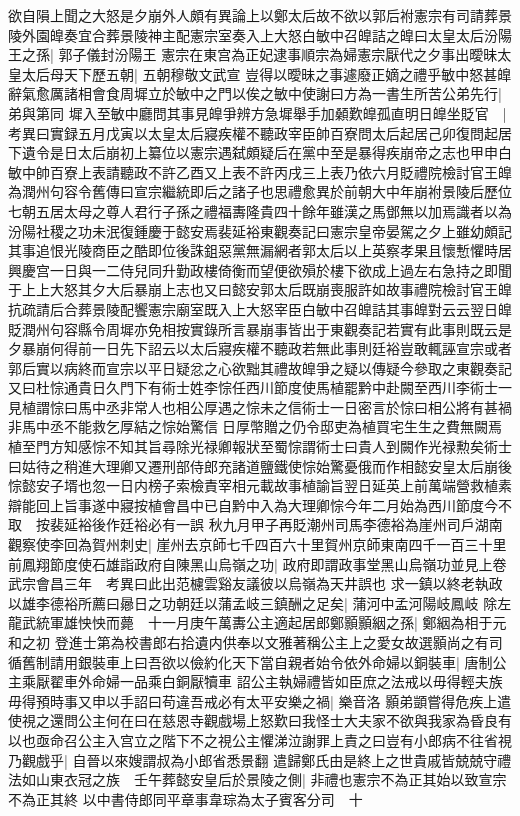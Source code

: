 欲自隕上聞之大怒是夕崩外人頗有異論上以鄭太后故不欲以郭后袝憲宗有司請葬景陵外園皥奏宜合葬景陵神主配憲宗室奏入上大怒白敏中召皥詰之皥曰太皇太后汾陽王之孫|{
	郭子儀封汾陽王}
憲宗在東宫為正妃逮事順宗為婦憲宗厭代之夕事出曖昧太皇太后母天下歷五朝|{
	五朝穆敬文武宣}
豈得以曖昧之事遽廢正嫡之禮乎敏中怒甚皥辭氣愈厲諸相會食周墀立於敏中之門以俟之敏中使謝曰方為一書生所苦公弟先行|{
	弟與第同}
墀入至敏中廳問其事見皥爭辨方急墀舉手加顙歎皥孤直明日皥坐貶官　|{
	考異曰實録五月戊寅以太皇太后寢疾權不聽政宰臣帥百寮問太后起居己卯復問起居下遺令是日太后崩初上纂位以憲宗遇弑頗疑后在黨中至是暴得疾崩帝之志也甲申白敏中帥百寮上表請聽政不許乙酉又上表不許丙戌三上表乃依六月貶禮院檢討官王皥為潤州句容令舊傳曰宣宗繼統即后之諸子也思禮愈異於前朝大中年崩袝景陵后歷位七朝五居太母之尊人君行子孫之禮福夀隆貴四十餘年雖漢之馬鄧無以加焉識者以為汾陽社稷之功未泯復鍾慶于懿安焉裴延裕東觀奏記曰憲宗皇帝晏駕之夕上雖幼頗記其事追恨光陵商臣之酷即位後誅鉏惡黨無漏網者郭太后以上英察孝果且懷慙懼時居興慶宫一日與一二侍兒同升勤政樓倚衡而望便欲殞於樓下欲成上過左右急持之即聞于上上大怒其夕大后暴崩上志也又曰懿安郭太后既崩喪服許如故事禮院檢討官王皥抗疏請后合葬景陵配饗憲宗廟室既入上大怒宰臣白敏中召皥詰其事皥對云云翌日皥貶潤州句容縣令周墀亦免相按實錄所言暴崩事皆出于東觀奏記若實有此事則既云是夕暴崩何得前一日先下詔云以太后寢疾權不聽政若無此事則廷裕豈敢輒誣宣宗或者郭后實以病終而宣宗以平日疑忿之心欲黜其禮故皥爭之疑以傳疑今參取之東觀奏記又曰杜悰通貴日久門下有術士姓李悰任西川節度使馬植罷黔中赴闕至西川李術士一見植謂悰曰馬中丞非常人也相公厚遇之悰未之信術士一日密言於悰曰相公將有甚禍非馬中丞不能救乞厚結之悰始驚信日厚幣贈之仍令邸吏為植買宅生生之費無闕焉植至門方知感悰不知其旨尋除光禄卿報狀至蜀悰謂術士曰貴人到闕作光禄勲矣術士曰姑待之稍進大理卿又遷刑部侍郎充諸道鹽鐵使悰始驚憂俄而作相懿安皇太后崩後悰懿安子壻也忽一日内榜子索檢責宰相元載故事植諭旨翌日延英上前萬端營救植素辯能回上旨事遂中寢按植會昌中已自黔中入為大理卿悰今年二月始為西川節度今不取　按裴延裕後作廷裕必有一誤}
秋九月甲子再貶潮州司馬李德裕為崖州司戶湖南觀察使李回為賀州刺史|{
	崖州去京師七千四百六十里賀州京師東南四千一百三十里}
前鳳翔節度使石雄詣政府自陳黑山烏嶺之功|{
	政府即謂政事堂黑山烏嶺功並見上卷武宗會昌三年　考異曰此出范櫖雲谿友議彼以烏嶺為天井誤也}
求一鎮以終老執政以雄李德裕所薦曰曏日之功朝廷以蒲孟岐三鎮酬之足矣|{
	蒲河中孟河陽岐鳳岐}
除左龍武統軍雄怏怏而薨　十一月庚午萬夀公主適起居郎鄭顥顥絪之孫|{
	鄭絪為相于元和之初}
登進士第為校書郎右拾遺内供奉以文雅著稱公主上之愛女故選顥尚之有司循舊制請用銀裝車上曰吾欲以儉約化天下當自親者始令依外命婦以銅裝車|{
	唐制公主乘厭翟車外命婦一品乘白銅厭犢車}
詔公主執婦禮皆如臣庶之法戒以毋得輕夫族毋得預時事又申以手詔曰苟違吾戒必有太平安樂之禍|{
	樂音洛}
顥弟顗嘗得危疾上遣使視之還問公主何在曰在慈恩寺觀戲場上怒歎曰我怪士大夫家不欲與我家為昏良有以也亟命召公主入宫立之階下不之視公主懼涕泣謝罪上責之曰豈有小郎病不往省視乃觀戲乎|{
	自晉以來嫂謂叔為小郎省悉景翻}
遣歸鄭氏由是終上之世貴戚皆兢兢守禮法如山東衣冠之族　壬午葬懿安皇后於景陵之側|{
	非禮也憲宗不為正其始以致宣宗不為正其終}
以中書侍郎同平章事韋琮為太子賓客分司　十

